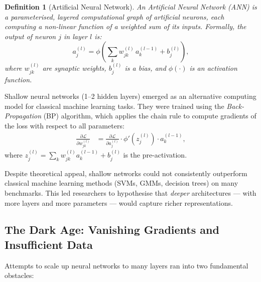 \documentclass[12pt,a4paper]{article}
\newtheorem{definition}{Definition}[section]
\begin{document}
\begin{definition}[Artificial Neural Network]
\label{def:ann}
An \emph{Artificial Neural Network} (ANN) is a parameterised, layered
computational graph of artificial neurons, each computing a non-linear
function of a weighted sum of its inputs.  Formally, the output of neuron $j$
in layer $l$ is:
\begin{equation}
  \label{eq:neuron}
  a_j^{(l)} = \phi\!\left(\sum_{k} w_{jk}^{(l)}\, a_k^{(l-1)} + b_j^{(l)}\right),
\end{equation}
where $w_{jk}^{(l)}$ are synaptic weights, $b_j^{(l)}$ is a bias,
and $\phi(\cdot)$ is an activation function.
\end{definition}

Shallow neural networks (1--2 hidden layers) emerged as an alternative
computing model for classical machine learning tasks.  They were trained using
the \emph{Back-Propagation} (BP) algorithm, which applies the chain rule to
compute gradients of the loss with respect to all parameters:
\begin{align}
  \label{eq:backprop}
  \frac{\partial \mathcal{L}}{\partial w_{jk}^{(l)}}
  &= \frac{\partial \mathcal{L}}{\partial a_j^{(l)}}
     \cdot \phi'\!\left(z_j^{(l)}\right)
     \cdot a_k^{(l-1)},
\end{align}
where $z_j^{(l)} = \sum_k w_{jk}^{(l)} a_k^{(l-1)} + b_j^{(l)}$ is the
pre-activation.

Despite theoretical appeal, shallow networks could not consistently outperform
classical machine learning methods (SVMs, GMMs, decision trees) on many
benchmarks.  This led researchers to hypothesise that \emph{deeper}
architectures — with more layers and more parameters — would capture richer
representations.

\subsection{The Dark Age: Vanishing Gradients and Insufficient Data}
\label{subsec:darkage}

Attempts to scale up neural networks to many layers ran into two fundamental
obstacles:
\end{document}

